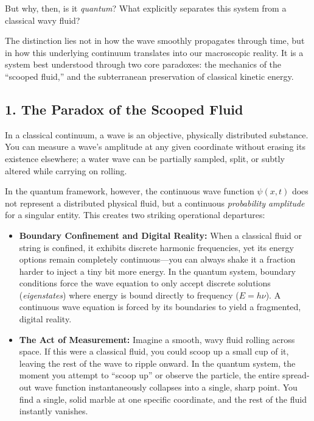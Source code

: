 But why, then, is it \textit{quantum}? What explicitly separates this system from a classical wavy fluid?

The distinction lies not in how the wave smoothly propagates through time, but in how this underlying continuum translates into our macroscopic reality.
It is a system best understood through two core paradoxes: the mechanics of the ``scooped fluid,'' and the subterranean preservation of classical kinetic energy.

\subsection*{1. The Paradox of the Scooped Fluid}

In a classical continuum, a wave is an objective, physically distributed substance.
You can measure a wave's amplitude at any given coordinate without erasing its existence elsewhere; a water wave can be partially sampled, split, or subtly altered while carrying on rolling.

In the quantum framework, however, the continuous wave function $\psi(x,t)$ does not represent a distributed physical fluid, but a continuous \textit{probability amplitude} for a singular entity.
This creates two striking operational departures:
\begin{itemize}
\item \textbf{Boundary Confinement and Digital Reality:} When a classical fluid or string is confined, it exhibits discrete harmonic frequencies, yet its energy options remain completely continuous---you can always shake it a fraction harder to inject a tiny bit more energy.
  In the quantum system, boundary conditions force the wave equation to only accept discrete solutions (\textit{eigenstates}) where energy is bound directly to frequency ($E = h\nu$).
  A continuous wave equation is forced by its boundaries to yield a fragmented, digital reality.
\item \textbf{The Act of Measurement:} Imagine a smooth, wavy fluid rolling across space.
  If this were a classical fluid, you could scoop up a small cup of it, leaving the rest of the wave to ripple onward.
  In the quantum system, the moment you attempt to ``scoop up'' or observe the particle, the entire spread-out wave function instantaneously collapses into a single, sharp point.
  You find a single, solid marble at one specific coordinate, and the rest of the fluid instantly vanishes. 
\end{itemize}

